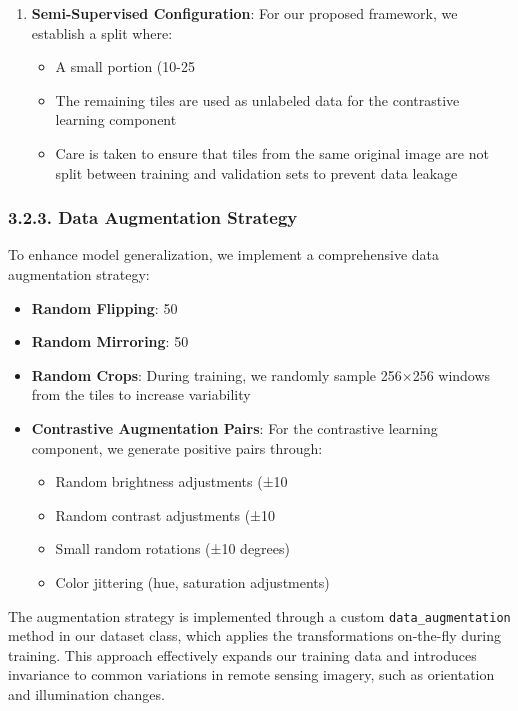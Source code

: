 \documentclass[conference]{IEEEtran}
\begin{document}
\begin{enumerate}
    \item \textbf{Semi-Supervised Configuration}: For our proposed framework, we establish a split where:
    \begin{itemize}
        \item A small portion (10-25%
        \item The remaining tiles are used as unlabeled data for the contrastive learning component
        \item Care is taken to ensure that tiles from the same original image are not split between training and validation sets to prevent data leakage
    \end{itemize}
\end{enumerate}

\subsubsection*{3.2.3. Data Augmentation Strategy}

To enhance model generalization, we implement a comprehensive data augmentation strategy:

\begin{itemize}
    \item \textbf{Random Flipping}: 50%
    \item \textbf{Random Mirroring}: 50%
    \item \textbf{Random Crops}: During training, we randomly sample 256×256 windows from the tiles to increase variability
    \item \textbf{Contrastive Augmentation Pairs}: For the contrastive learning component, we generate positive pairs through:
    \begin{itemize}
        \item Random brightness adjustments (±10%
        \item Random contrast adjustments (±10%
        \item Small random rotations (±10 degrees)
        \item Color jittering (hue, saturation adjustments)
    \end{itemize}
\end{itemize}

The augmentation strategy is implemented through a custom \texttt{data\_augmentation} method in our dataset class, which applies the transformations on-the-fly during training. This approach effectively expands our training data and introduces invariance to common variations in remote sensing imagery, such as orientation and illumination changes.
\end{document}

